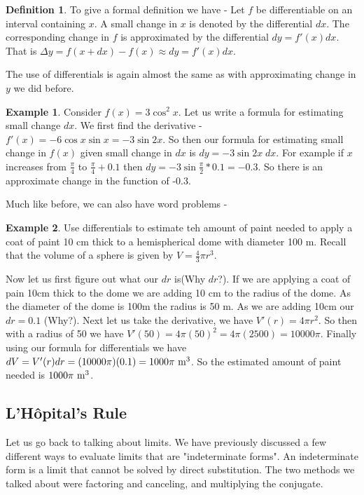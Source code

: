 \documentclass[12pt,reqno]{article}
\theoremstyle{definition}
\newtheorem*{Definition}{Definition}
\newtheorem*{Example}{Example}
\begin{document}
\begin{Definition}
To give a formal definition we have - Let $f$ be differentiable on an interval containing $x$. A small change in $x$ is denoted by the differential $dx$. The corresponding change in $f$ is approximated by the differential $dy = f'(x) dx$. That is $\Delta y = f(x + dx) - f(x) \approx dy = f'(x) dx$. 
\end{Definition}

The use of differentials is again almost the same as with approximating change in $y$ we did before. 
\begin{Example}
	Consider $f(x) = 3 \cos^2 x$. Let us write a formula for estimating small change $dx$. We first find the derivative  - $f'(x) = -6 \cos x \sin x = -3 \sin 2x$. So then our formula for estimating small change in $f(x)$ given small change in $dx$ is $dy = -3 \sin 2x \; dx$. For example if $x$ increases from $\frac{\pi}{4}$ to $\frac{\pi}{4} + 0.1$ then $dy = -3 \sin \frac{\pi}{2} * 0.1 = -0.3$. So there is an approximate change in the function of -0.3. 
\end{Example}

Much like before, we can also have word problems - 
\begin{Example}
	Use differentials to estimate teh amount of paint needed to apply a coat of paint 10 cm thick to a hemispherical dome with diameter 100 m. Recall that the volume of a sphere is given by $V = \frac{4}{3} \pi r^3$. 
	
	Now let us first figure out what our $dr$ is(Why $dr$?). If we are applying a coat of pain 10cm thick to the dome we are adding 10 cm to the radius of the dome. As the diameter of the dome is 100m the radius is 50 m. As we are adding 10cm our $dr = 0.1$ (Why?).
	Next let us take the derivative, we have $V'(r) = 4 \pi r^2$. So then with a radius of 50 we have $V'(50) = 4 \pi (50)^2 = 4 \pi (2500) = 10000\pi$. 
	Finally using our formula for differentials we have $dV = V'(r) dr = (10000\pi)(0.1) = 1000\pi \textnormal{ m}^3$. So the estimated amount of paint needed is $1000\pi \textnormal{ m}^3$. 
\end{Example}
\subsection{L'H\^{o}pital's Rule}

Let us go back to talking about limits. We have previously discussed a few different ways to evaluate limits that are "indeterminate forms". An indeterminate form is a limit that cannot be solved by direct substitution. The two methods we talked about were factoring and canceling, and multiplying the conjugate. 
\end{document}
